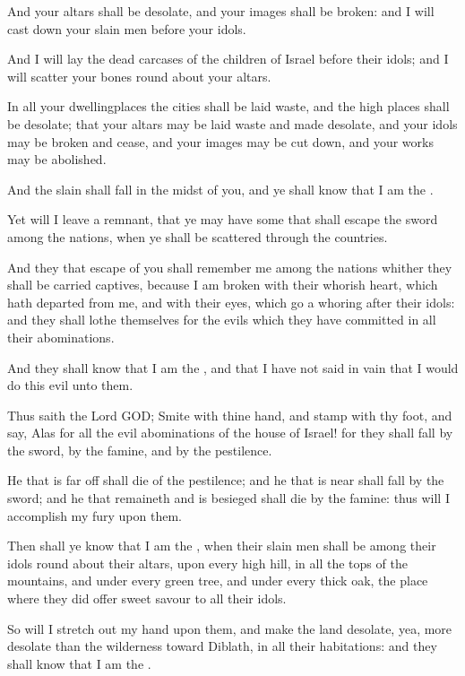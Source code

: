 \verse And your altars shall be desolate, and your images shall be broken: and I will cast down your slain men before your idols.

\verse And I will lay the dead carcases of the children of Israel before their idols; and I will scatter your bones round about your altars.

\verse In all your dwellingplaces the cities shall be laid waste, and the high places shall be desolate; that your altars may be laid waste and made desolate, and your idols may be broken and cease, and your images may be cut down, and your works may be abolished.

\verse And the slain shall fall in the midst of you, and ye shall know that I am the \LORD.

\verse Yet will I leave a remnant, that ye may have some that shall escape the sword among the nations, when ye shall be scattered through the countries.

\verse And they that escape of you shall remember me among the nations whither they shall be carried captives, because I am broken with their whorish heart, which hath departed from me, and with their eyes, which go a whoring after their idols: and they shall lothe themselves for the evils which they have committed in all their abominations.

\verse And they shall know that I am the \LORD, and that I have not said in vain that I would do this evil unto them.

\verse Thus saith the Lord GOD; Smite with thine hand, and stamp with thy foot, and say, Alas for all the evil abominations of the house of Israel! for they shall fall by the sword, by the famine, and by the pestilence.

\verse He that is far off shall die of the pestilence; and he that is near shall fall by the sword; and he that remaineth and is besieged shall die by the famine: thus will I accomplish my fury upon them.

\verse Then shall ye know that I am the \LORD, when their slain men shall be among their idols round about their altars, upon every high hill, in all the tops of the mountains, and under every green tree, and under every thick oak, the place where they did offer sweet savour to all their idols.

\verse So will I stretch out my hand upon them, and make the land desolate, yea, more desolate than the wilderness toward Diblath, in all their habitations: and they shall know that I am the \LORD.


